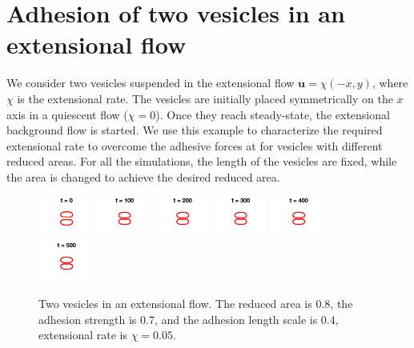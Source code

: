 \documentclass[%
preprint,
 amsmath,amssymb,
 aps,
]{revtex4-1}
\newcommand{\uu}{\mathbf{u}}
\begin{document}
\newpage %
\section{Adhesion of two vesicles in an extensional flow} 
\label{sec:eflow} 
We consider two vesicles suspended in the extensional flow $\uu =
\chi(-x,y)$, where $\chi$ is the extensional rate.  The vesicles are
initially placed symmetrically on the $x$ axis in a quiescent flow
($\chi = 0$).  Once they reach steady-state, the extensional background
flow is started.  We use this example to characterize the required
extensional rate to overcome the adhesive forces at for vesicles with
different reduced areas.  For all the simulations, the length of the
vesicles are fixed, while the area is changed to achieve the desired
reduced area.

\begin{figure}[htp]
  \includegraphics[width = 0.16\textwidth]{figs/extensional_adR4em1adS7em1Chi5em2_ra080_image01.png}
  \includegraphics[width = 0.16\textwidth]{figs/extensional_adR4em1adS7em1Chi5em2_ra080_image02.png}
  \includegraphics[width = 0.16\textwidth]{figs/extensional_adR4em1adS7em1Chi5em2_ra080_image03.png}
  \includegraphics[width = 0.16\textwidth]{figs/extensional_adR4em1adS7em1Chi5em2_ra080_image04.png}
  \includegraphics[width = 0.16\textwidth]{figs/extensional_adR4em1adS7em1Chi5em2_ra080_image05.png}
  \includegraphics[width = 0.16\textwidth]{figs/extensional_adR4em1adS7em1Chi5em2_ra080_image06.png}
  \caption{Two vesicles in an extensional flow.  The reduced area is
  $0.8$, the adhesion strength is $0.7$, and the adhesion length scale
is $0.4$, extensional rate is $\chi = 0.05$.}
\end{figure}
\end{document}
